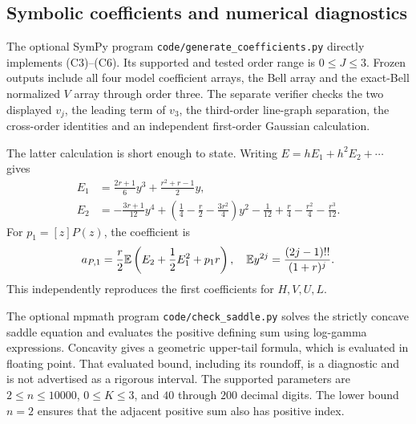 \subsection{Symbolic coefficients and numerical diagnostics}
The optional SymPy program \texttt{code/generate\_coefficients.py} directly implements (C3)--(C6). Its supported and tested order range is $0\le J\le3$. Frozen outputs include all four model coefficient arrays, the Bell array and the exact-Bell normalized $V$ array through order three. The separate verifier checks the two displayed $v_j$, the leading term of $v_3$, the third-order line-graph separation, the cross-order identities and an independent first-order Gaussian calculation.

The latter calculation is short enough to state. Writing $E=hE_1+h^2E_2+\cdots$ gives
\begin{align*}
E_1&=\frac{2r+1}{6}y^3+\frac{r^2+r-1}{2}y,\\
E_2&=-\frac{3r+1}{12}y^4+
 \left(\frac14-\frac r2-\frac{3r^2}{4}\right)y^2
 -\frac1{12}+\frac r4-\frac{r^2}{4}-\frac{r^3}{12}.
\end{align*}
For $p_1=[z]P(z)$, the coefficient is
\[
a_{P,1}=\frac r2\mathbb E\left(E_2+\frac12E_1^2+p_1r\right),
\quad \mathbb E y^{2j}=\frac{(2j-1)!!}{(1+r)^j}.
\]
This independently reproduces the first coefficients for $H,V,U,L$.

The optional mpmath program \texttt{code/check\_saddle.py} solves the strictly concave saddle equation and evaluates the positive defining sum using log-gamma expressions. Concavity gives a geometric upper-tail formula, which is evaluated in floating point. That evaluated bound, including its roundoff, is a diagnostic and is not advertised as a rigorous interval. The supported parameters are $2\le n\le10000$, $0\le K\le3$, and $40$ through $200$ decimal digits. The lower bound $n=2$ ensures that the adjacent positive sum also has positive index.


